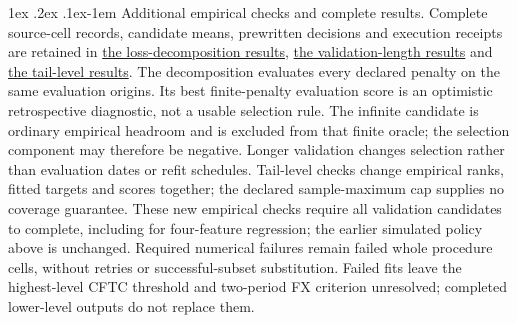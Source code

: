 \documentclass[10pt,a4paper]{article}
\makeatletter
\renewcommand\paragraph{\@startsection{paragraph}{4}{\z@}%
  {1ex \@plus .2ex \@minus .1ex}{-1em}%
  {\normalfont\normalsize\bfseries}}
\makeatother
\begin{document}
\paragraph{Additional empirical checks and complete results.}
Complete source-cell records, candidate means, prewritten decisions and execution receipts are retained in \href{https://github.com/ByronLi0207/financial-mathematics-paper-20261020/tree/revision-v12/results/v12/decomposition}{the loss-decomposition results}, \href{https://github.com/ByronLi0207/financial-mathematics-paper-20261020/tree/revision-v12/results/v12/validation-length}{the validation-length results} and \href{https://github.com/ByronLi0207/financial-mathematics-paper-20261020/tree/revision-v12/results/v12/tau}{the tail-level results}. The decomposition evaluates every declared penalty on the same evaluation origins. Its best finite-penalty evaluation score is an optimistic retrospective diagnostic, not a usable selection rule. The infinite candidate is ordinary empirical headroom and is excluded from that finite oracle; the selection component may therefore be negative. Longer validation changes selection rather than evaluation dates or refit schedules. Tail-level checks change empirical ranks, fitted targets and scores together; the declared sample-maximum cap supplies no coverage guarantee. These new empirical checks require all validation candidates to complete, including for four-feature regression; the earlier simulated policy above is unchanged. Required numerical failures remain failed whole procedure cells, without retries or successful-subset substitution. Failed fits leave the highest-level CFTC threshold and two-period FX criterion unresolved; completed lower-level outputs do not replace them.


\end{document}
